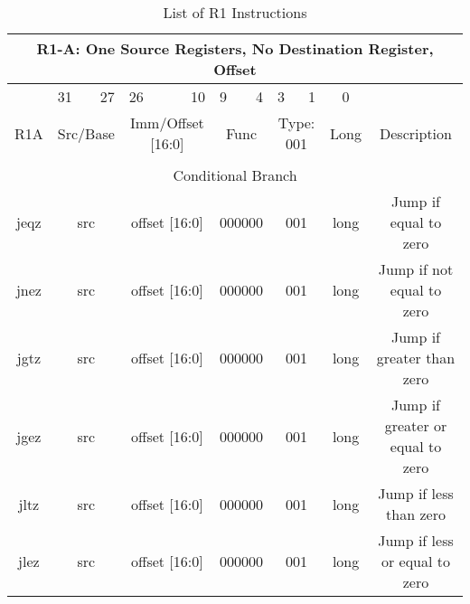\documentclass{article}
\begin{document}
    \begin{center}
    \begin{longtable}{|c|l|r|l|r|l|r|l|r|c|c|}
    \caption{List of R1 Instructions}
    \label{table:r1_instr} \\

                    \multicolumn{11}{c}{R1-A: One Source Registers, No Destination Register, Offset} \\ 
    \hline      &   \multicolumn{1}{l}{31}  &   27      &   \multicolumn{1}{l}{26}  &   10          &   \multicolumn{1}{l}{9}   &   4   &   \multicolumn{1}{l}{3}   &   1   &   0       & \\
    \hline R1A  &   \multicolumn{2}{|c|}{Src/Base}      &   \multicolumn{2}{|c|}{Imm/Offset [16:0]} &   \multicolumn{2}{|c|}{Func}      &   \multicolumn{2}{|c|}{Type: 001} &   Long    &   Description \\
    
    
    \hline          \multicolumn{11}{|c|}{} \\
    
                    \multicolumn{11}{|c|}{Conditional Branch} \\
    \hline jeqz &   \multicolumn{2}{|c|}{src}   &   \multicolumn{2}{|c|}{offset [16:0]} &   \multicolumn{2}{|c|}{000000}    &   \multicolumn{2}{|c|}{001}   &   long    & Jump if equal to zero \\
    \hline jnez &   \multicolumn{2}{|c|}{src}   &   \multicolumn{2}{|c|}{offset [16:0]} &   \multicolumn{2}{|c|}{000000}    &   \multicolumn{2}{|c|}{001}   &   long    & Jump if not equal to zero \\
    \hline jgtz &   \multicolumn{2}{|c|}{src}   &   \multicolumn{2}{|c|}{offset [16:0]} &   \multicolumn{2}{|c|}{000000}    &   \multicolumn{2}{|c|}{001}   &   long    & Jump if greater than zero \\
    \hline jgez &   \multicolumn{2}{|c|}{src}   &   \multicolumn{2}{|c|}{offset [16:0]} &   \multicolumn{2}{|c|}{000000}    &   \multicolumn{2}{|c|}{001}   &   long    & Jump if greater or equal to zero \\
    \hline jltz &   \multicolumn{2}{|c|}{src}   &   \multicolumn{2}{|c|}{offset [16:0]} &   \multicolumn{2}{|c|}{000000}    &   \multicolumn{2}{|c|}{001}   &   long    & Jump if less than zero \\
    \hline jlez &   \multicolumn{2}{|c|}{src}   &   \multicolumn{2}{|c|}{offset [16:0]} &   \multicolumn{2}{|c|}{000000}    &   \multicolumn{2}{|c|}{001}   &   long    & Jump if less or equal to zero \\
    

\end{longtable}
\end{center}
\end{document}
